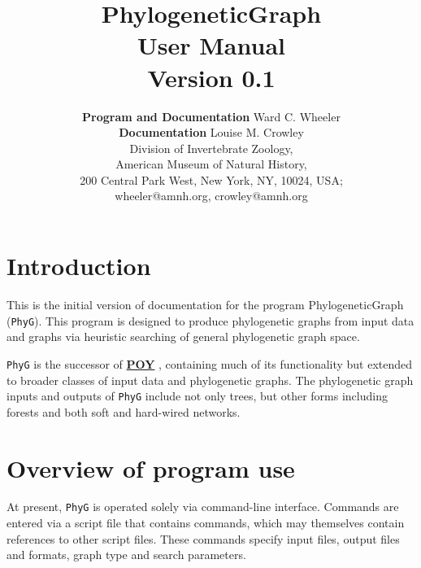 \documentclass[11pt]{article}
\begin{document}
	
	\title{PhylogeneticGraph\\User Manual\\Version 0.1}
	\author{{\textbf{Program and Documentation}} Ward C. Wheeler\\ {\textbf{Documentation}} Louise M. Crowley\\
		Division of Invertebrate Zoology,\\ American Museum of Natural History,\\ 200 Central Park West, New York, NY, 10024, USA;\\wheeler@amnh.org, crowley@amnh.org}
	
	
	\maketitle
	\newpage
	
	\tableofcontents
	\newpage
	\section{Introduction}
	This is the initial version of documentation for the program PhylogeneticGraph (\texttt{PhyG}).  
	This program is designed to produce phylogenetic graphs from input data and graphs via heuristic
	searching of general phylogenetic graph space.
	
	
	\texttt{PhyG} is the successor of \href{https://github.com/wardwheeler/POY5}{\textbf{POY}} \citep{POY2,POY3,POY4,Varonetal2010,POY5, Wheeleretal2015}, containing much of its functionality
	 but extended to broader classes of input data and phylogenetic graphs.
	The phylogenetic graph inputs and outputs of \texttt{PhyG} include not only trees, but other forms
	 including forests and both soft and hard-wired networks.
	
	
	\section{Overview of program use}
	
	At present, \texttt{PhyG} is operated solely via command-line interface. %
	Commands are entered via a script file that contains commands, which may themselves contain
	references to other script files.
	These commands specify input files, output files and formats, graph type and search parameters. 
	
\end{document}
